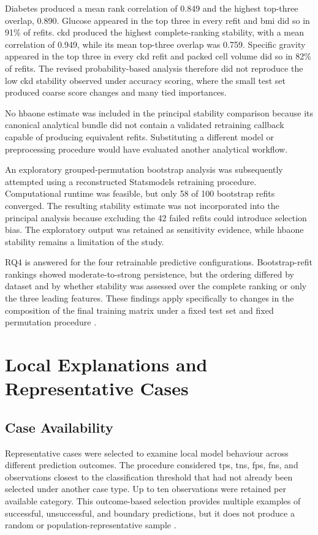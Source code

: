 Diabetes produced a mean rank correlation of 0.849 and the highest top-three overlap, 0.890. Glucose appeared in the top three in every refit and \gls{bmi} did so in 91\% of refits. \gls{ckd} produced the highest complete-ranking stability, with a mean correlation of 0.949, while its mean top-three overlap was 0.759. Specific gravity appeared in the top three in every \gls{ckd} refit and packed cell volume did so in 82\% of refits. The revised probability-based analysis therefore did not reproduce the low \gls{ckd} stability observed under accuracy scoring, where the small test set produced coarse score changes and many tied importances.

No \gls{hbaone} estimate was included in the principal stability comparison because its canonical analytical bundle did not contain a validated retraining callback capable of producing equivalent refits. Substituting a different model or preprocessing procedure would have evaluated another analytical workflow.

An exploratory grouped-permutation bootstrap analysis was subsequently attempted using a reconstructed Statsmodels retraining procedure. Computational runtime was feasible, but only 58 of 100 bootstrap refits converged. The resulting stability estimate was not incorporated into the principal analysis because excluding the 42 failed refits could introduce selection bias. The exploratory output was retained as sensitivity evidence, while \gls{hbaone} stability remains a limitation of the study.

RQ4 is answered for the four retrainable predictive configurations. Bootstrap-refit rankings showed moderate-to-strong persistence, but the ordering differed by dataset and by whether stability was assessed over the complete ranking or only the three leading features. These findings apply specifically to changes in the composition of the final training matrix under a fixed test set and fixed permutation procedure \citep{lofstrom_meta_2022, canha_functionally-grounded_2025}.

\section{Local Explanations and Representative Cases}

\subsection{Case Availability}

Representative cases were selected to examine local model behaviour across different prediction outcomes. The procedure considered \glspl{tp}, \glspl{tn}, \glspl{fp}, \glspl{fn}, and observations closest to the classification threshold that had not already been selected under another case type. Up to ten observations were retained per available category. This outcome-based selection provides multiple examples of successful, unsuccessful, and boundary predictions, but it does not produce a random or population-representative sample \citep{ribeiro_why_2016, vilone_classification_2021}.


